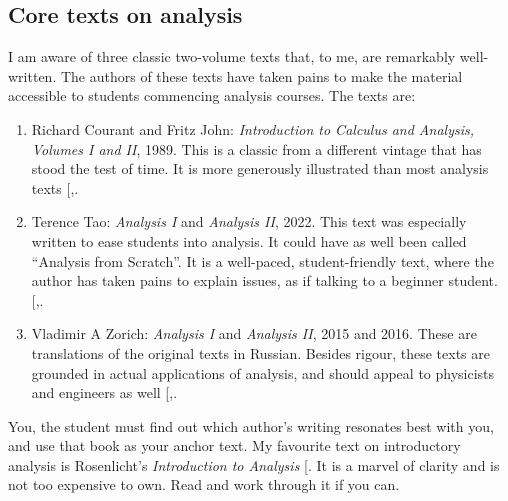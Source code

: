 \documentclass[
  a4paper,
]{article}
\begin{document}
\subsection{Core texts on analysis}\label{core-texts-on-analysis}

I am aware of three classic two-volume texts that, to me, are remarkably
well-written. The authors of these texts have taken pains to make the
material accessible to students commencing analysis courses. The texts
are:

\begin{enumerate}
\def\labelenumi{\arabic{enumi}.}
\item
  Richard Courant and Fritz John: \emph{Introduction to Calculus and
  Analysis, Volumes I and II}, 1989. This is a classic from a different
  vintage that has stood the test of time. It is more generously
  illustrated than most analysis texts
  {[},\citeproc{ref-courant-john-two}{5}{]}.
\item
  Terence Tao: \emph{Analysis I} and \emph{Analysis II}, 2022. This text
  was especially written to ease students into analysis. It could have
  as well been called ``Analysis from Scratch''. It is a well-paced,
  student-friendly text, where the author has taken pains to explain
  issues, as if talking to a beginner student.
  {[},\citeproc{ref-tao-two-2022}{7}{]}.
\item
  Vladimir A Zorich: \emph{Analysis I} and \emph{Analysis II}, 2015 and
  2016. These are translations of the original texts in Russian. Besides
  rigour, these texts are grounded in actual applications of analysis,
  and should appeal to physicists and engineers as well
  {[},\citeproc{ref-zorich-two-2016}{9}{]}.
\end{enumerate}

You, the student must find out which author's writing resonates best
with you, and use that book as your anchor text. My favourite text on
introductory analysis is Rosenlicht's \emph{Introduction to Analysis}
{[}\citeproc{ref-rosenlicht1986}{10}{]}. It is a marvel of clarity and
is not too expensive to own. Read and work through it if you can.
\end{document}
